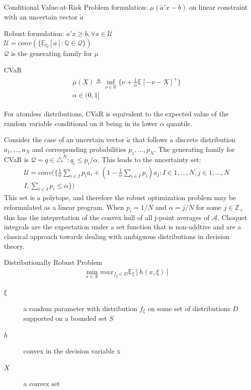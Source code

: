 \documentclass{beamer}
\begin{document}
\begin{frame}{Conditional Value-at-Risk}
Problem formulation:
$\mu(\tilde{a}'x-b)$ on linear constraint with an uncertain vector $\tilde{a}$

Robust formulation:
$a'x \geq b, \forall a \in \mathcal{U}$ \\
$\mathcal{U} = conv(\{\mathbb{E}_{\mathbb{Q}}[a] : \mathbb{Q} \in \mathcal{Q} \})$ \\
$\mathcal{Q}$ is the generating family for $\mu$

\begin{block}{CVaR}
\begin{align*}
\begin{split}
\mu(X) \triangleq \inf_{\nu \in \mathbb{R}}\{\nu + \frac{1}{\alpha}\mathbb{E}[-\nu-X]^{+}\} \\
\alpha \in (0,1]
\end{split}
\end{align*}
\end{block}
For atomless distributions, CVaR is equivalent to the expected value of the random variable conditional on it being in its lower $\alpha$ quantile.
\end{frame}

\begin{frame}{}
Consider the case of an uncertain vector $\tilde{a}$ that follows a discrete distribution ${a_{1},\dots,a_{N}}$ and corresponding probabilities ${p_{1},\dots,p_{N}}$.
The generating family for CVaR is $\mathcal{Q} = {q \in \triangle^{N} : q_{i} \leq p_{i}/\alpha}$.
This leads to the uncertainty set:
\begin{align*}
\mathcal{U} = conv(\{\frac{1}{\alpha}\sum_{i \in I}p_{i}a_{i} + (1 - \frac{1}{\alpha}\sum_{i \in I}p_{i})a_{j} : I \in {1,\dots,N}, j \in {1,\dots,N}\\I, \sum_{i \in I}p_{i} \leq \alpha \})
\end{align*}
This set is a polytope, and therefore the robust optimization problem may be reformulated as a linear program.
When $p_{i} = 1/N$ and $\alpha = j/N$ for some $j \in \mathbb{Z}_{+}$ this has the intepretation of the convex hull of all j-point averages of $\mathcal{A}$.
Choquet integrals are the expectation under a set function that is non-addtive and are a classical approach towards dealing with ambiguous distributions in decision theory.
\end{frame}

\begin{frame}{Distributionally Robust Problem}
\begin{align*}
\min_{x \in X} max_{f_{\xi} \in D} \mathbb{E}_{\xi}[h(x, \xi)]
\end{align*}
\begin{description}
\item [$\xi$] a random parameter with distribution $f_{\xi}$ on some set of distributions $D$ supported on a bounded set $S$
\item [$h$] convex in the decision variable x
\item [$X$] a convex set
\end{description}
\end{frame}
\end{document}

